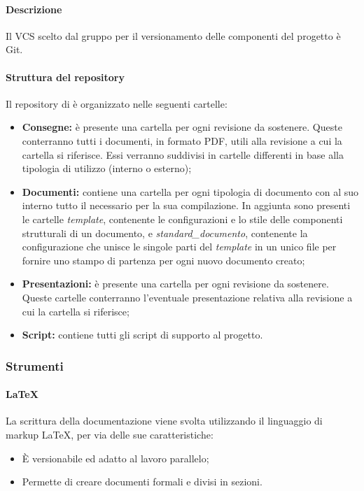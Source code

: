 \paragraph{Descrizione}
Il VCS scelto dal gruppo per il versionamento delle componenti del progetto è Git.

\paragraph{Struttura del repository}
Il repository di \groupName{} è organizzato nelle seguenti cartelle:

\begin{itemize}
	\item \textbf{Consegne:} è presente una cartella per ogni revisione da sostenere. Queste conterranno tutti i documenti, in formato PDF, utili alla revisione a cui la cartella si riferisce. Essi verranno suddivisi in cartelle differenti in base alla tipologia di utilizzo (interno o esterno);
	\item \textbf{Documenti:} contiene una cartella per ogni tipologia di documento con al suo interno tutto il necessario per la sua compilazione. In aggiunta sono presenti le cartelle \textit{template}, contenente le configurazioni e lo stile delle componenti strutturali  di un documento, e \textit{standard\_documento}, contenente la configurazione che unisce le singole parti del \textit{template} in un unico file per fornire uno stampo di partenza per ogni nuovo documento creato;
	\item \textbf{Presentazioni:} è presente una cartella per ogni revisione da sostenere. Queste cartelle conterranno l'eventuale presentazione relativa alla revisione a cui la cartella si riferisce;
	\item \textbf{Script:} contiene tutti gli script di supporto al progetto.
\end{itemize}

\subsubsection{Strumenti}\label{paragraph:strumenti}
\paragraph{\LaTeX}

La scrittura della documentazione viene svolta utilizzando il linguaggio di markup \LaTeX , per via delle sue caratteristiche:

\begin{itemize}
	\item È versionabile ed adatto al lavoro parallelo;
	\item Permette di creare documenti formali e divisi in sezioni.
	
\end{itemize} 

